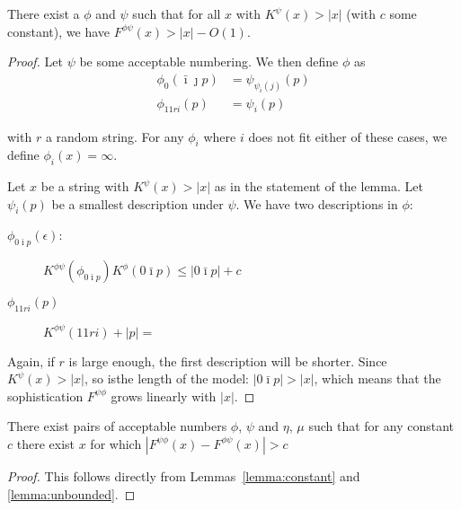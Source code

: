 \documentclass{style/llncs}
\begin{document}
\begin{lemma}
There exist a $\phi$ and $\psi$ such that for all $x$ with $K^\psi(x) > |x|$ (with $c$ some constant), we have $F^{\phi\psi}(x) > |x| - O(1)$. \label{lemma:unbounded}
\end{lemma}
\begin{proof}
Let $\psi$ be some acceptable numbering. We then define $\phi$ as
\begin{align*}
\phi_0(\bar\imath\jmath p) &= \psi_{\psi_i(j)}(p) \\
\phi_{11ri}(p) &= \psi_i(p)
\end{align*}

with $r$ a random string. For any $\phi_i$ where $i$ does not fit either of these cases, we define $\phi_i(x) = \infty$. 

Let $x$ be a string with $K^\psi(x) > |x|$ as in the statement of the lemma. Let $\psi_i(p)$ be a smallest description under $\psi$. We have two descriptions in $\phi$:

\begin{description}
\item[$\phi_{0\bar\imath p}(\epsilon)$:] $K^{\phi\psi}(\phi_{0\bar\imath p}) K^{\phi}(0\bar\imath p) \leq |0\bar\imath p| + c$
\item[$\phi_{11ri}(p)$] $K^{\phi\psi}(11ri) + |p| = $  
\end{description}

Again, if $r$ is large enough, the first description will be shorter. Since $K^\psi(x) > |x|$, so isthe length of the model: $|0\bar\imath p | > |x|$, which means that the sophistication $F^{\psi\phi}$ grows linearly with $|x|$.

\end{proof}
\begin{theorem}
There exist pairs of acceptable numbers $\phi$, $\psi$ and $\eta$, $\mu$ such that for any constant $c$ there exist $x$ for which $\left|F^{\psi\phi}(x) -F^{\phi\psi}(x)\right| > c$ 
\end{theorem}
\begin{proof}
This follows directly from Lemmas~\ref{lemma:constant} and \ref{lemma:unbounded}.
\end{proof}



\end{document}
